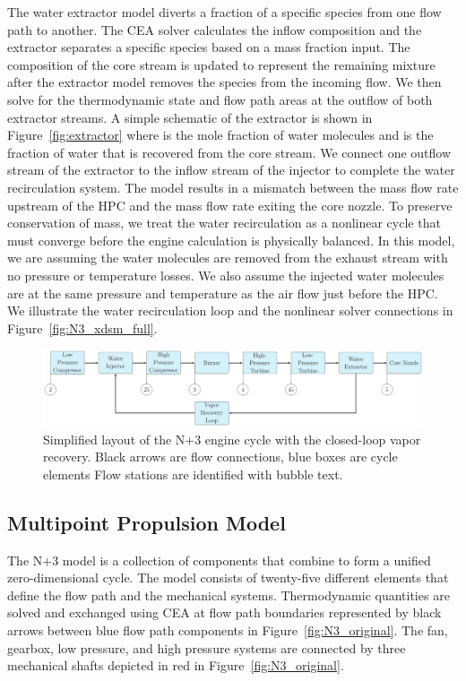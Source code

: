 \documentclass[conf]{new-aiaa}
\begin{document}
The water extractor model diverts a fraction of a specific species from one flow path to another.
The CEA solver calculates the inflow composition and the extractor separates a specific species based on a mass fraction input.
The composition of the core stream is updated to represent the remaining mixture after the extractor model removes the species from the incoming flow.
We then solve for the thermodynamic state and flow path areas at the outflow of both extractor streams.
A simple schematic of the extractor is shown in Figure~\ref{fig:extractor} where  is the mole fraction of water molecules and  is the fraction of water that is recovered from the core stream.
We connect one outflow stream of the extractor to the inflow stream of the injector to complete the water recirculation system.
The model results in a mismatch between the mass flow rate upstream of the HPC and the mass flow rate exiting the core nozzle.
To preserve conservation of mass, we treat the water recirculation as a nonlinear cycle that must converge before the engine calculation is physically balanced.
In this model, we are assuming the water molecules are removed from the exhaust stream with no pressure or temperature losses.
We also assume the injected water molecules are at the same pressure and temperature as the air flow just before the HPC.
We illustrate the water recirculation loop and the nonlinear solver connections in Figure~\ref{fig:N3_xdsm_full}.

\begin{figure}[hbt!]
    \centering
    \includegraphics[width=1.0\textwidth]{N3_CLVR_cycle.pdf}
    \caption{
        Simplified layout of the N+3 engine cycle with the closed-loop vapor recovery.
        Black arrows are flow connections, blue boxes are cycle elements
        Flow stations are identified with bubble text.
    }
    \label{fig:n3_clvr}
\end{figure}

\subsection{Multipoint Propulsion Model}
The N+3 model is a collection of components that combine to form a unified zero-dimensional cycle.
The model consists of twenty-five different elements that define the flow path and the mechanical systems.
Thermodynamic quantities are solved and exchanged using CEA at flow path boundaries represented by black arrows between blue flow path components in Figure~\ref{fig:N3_original}.
The fan, gearbox, low pressure, and high pressure systems are connected by three mechanical shafts depicted in red in Figure~\ref{fig:N3_original}.
\end{document}
